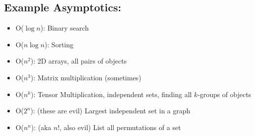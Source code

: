 \documentclass[10pt]{article}
\begin{document}
\subsection*{Example Asymptotics:}
\begin{itemize}
    \item O($\log n$): Binary search
	\item O($n \log n$): Sorting
	\item O($n^2$): 2D arrays, all pairs of objects
	\item O($n^3$): Matrix multiplication (sometimes)
	\item O($n^k$): Tensor Multiplication, independent sets, finding all $k$-groups of objects
	\item O($2^n$): (these are evil) Largest independent set in a graph
	\item O($n^n$): (aka $n!$, also evil) List all permutations of a set
\end{itemize}
\end{document}
